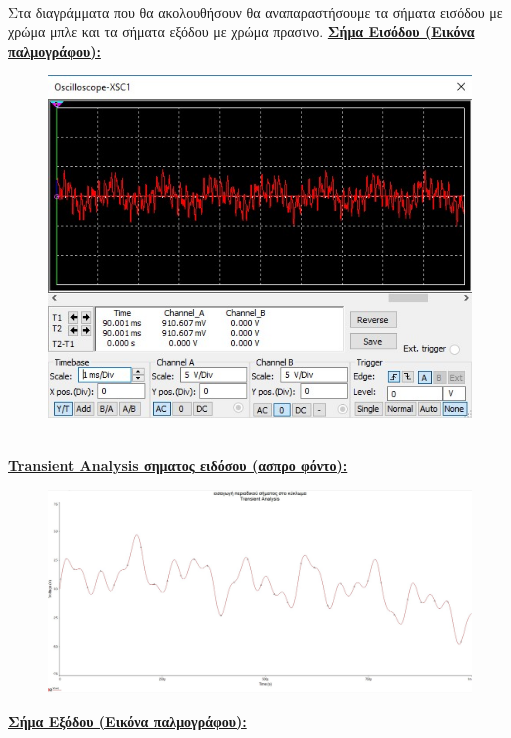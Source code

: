 \documentclass{article}
\begin{document}
{{{\begin{figure}[h!]
\end{figure} 
\\
Στα διαγράμματα που θα ακολουθήσουν θα αναπαραστήσουμε τα σήματα εισόδου με χρώμα μπλε και τα σήματα εξόδου με χρώμα πρασινο.
\clearpage
\textbf{\underline{Σήμα Εισόδου (Εικόνα παλμογράφου):}}
\begin{figure}[h!]
\centering
 	\advance\leftskip-1cm
  \includegraphics[width=120mm,scale=2]{thema4/mu1.jpg}
\end{figure} \\
\textbf{\underline{Transient Analysis σηματος ειδόσου (ασπρο φόντο):}}
\begin{figure}[h!]
\centering
 	\advance\leftskip-1cm
  \includegraphics[width=120mm,scale=2]{thema4/mu2.jpg}
\end{figure} 
\clearpage
\textbf{\underline{Σήμα Εξόδου (Εικόνα παλμογράφου):}}
\begin{figure}[h!]
\centering
 	\advance\leftskip-1cm

\end{figure}}}}
\end{document}
